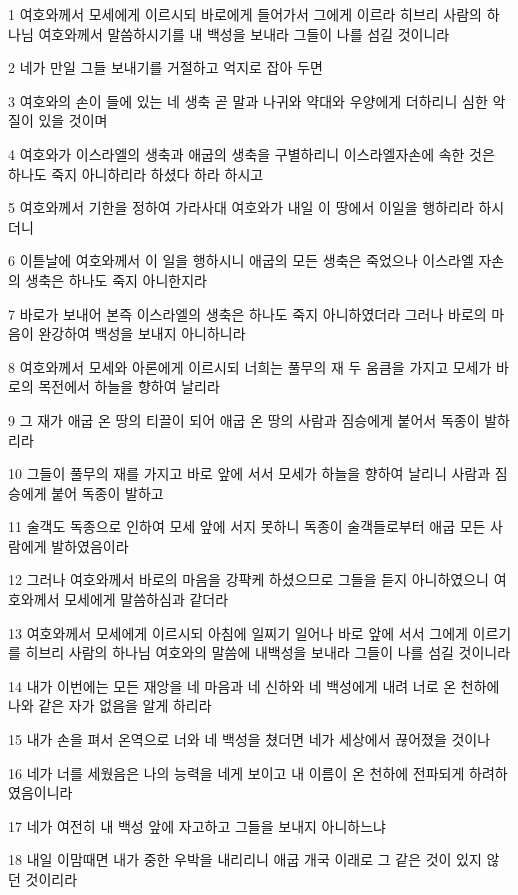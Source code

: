 \par 1 여호와께서 모세에게 이르시되 바로에게 들어가서 그에게 이르라 히브리 사람의 하나님 여호와께서 말씀하시기를 내 백성을 보내라 그들이 나를 섬길 것이니라
\par 2 네가 만일 그들 보내기를 거절하고 억지로 잡아 두면
\par 3 여호와의 손이 들에 있는 네 생축 곧 말과 나귀와 약대와 우양에게 더하리니 심한 악질이 있을 것이며
\par 4 여호와가 이스라엘의 생축과 애굽의 생축을 구별하리니 이스라엘자손에 속한 것은 하나도 죽지 아니하리라 하셨다 하라 하시고
\par 5 여호와께서 기한을 정하여 가라사대 여호와가 내일 이 땅에서 이일을 행하리라 하시더니
\par 6 이튿날에 여호와께서 이 일을 행하시니 애굽의 모든 생축은 죽었으나 이스라엘 자손의 생축은 하나도 죽지 아니한지라
\par 7 바로가 보내어 본즉 이스라엘의 생축은 하나도 죽지 아니하였더라 그러나 바로의 마음이 완강하여 백성을 보내지 아니하니라
\par 8 여호와께서 모세와 아론에게 이르시되 너희는 풀무의 재 두 움큼을 가지고 모세가 바로의 목전에서 하늘을 향하여 날리라
\par 9 그 재가 애굽 온 땅의 티끌이 되어 애굽 온 땅의 사람과 짐승에게 붙어서 독종이 발하리라
\par 10 그들이 풀무의 재를 가지고 바로 앞에 서서 모세가 하늘을 향하여 날리니 사람과 짐승에게 붙어 독종이 발하고
\par 11 술객도 독종으로 인하여 모세 앞에 서지 못하니 독종이 술객들로부터 애굽 모든 사람에게 발하였음이라
\par 12 그러나 여호와께서 바로의 마음을 강퍅케 하셨으므로 그들을 듣지 아니하였으니 여호와께서 모세에게 말씀하심과 같더라
\par 13 여호와께서 모세에게 이르시되 아침에 일찌기 일어나 바로 앞에 서서 그에게 이르기를 히브리 사람의 하나님 여호와의 말씀에 내백성을 보내라 그들이 나를 섬길 것이니라
\par 14 내가 이번에는 모든 재앙을 네 마음과 네 신하와 네 백성에게 내려 너로 온 천하에 나와 같은 자가 없음을 알게 하리라
\par 15 내가 손을 펴서 온역으로 너와 네 백성을 쳤더면 네가 세상에서 끊어졌을 것이나
\par 16 네가 너를 세웠음은 나의 능력을 네게 보이고 내 이름이 온 천하에 전파되게 하려하였음이니라
\par 17 네가 여전히 내 백성 앞에 자고하고 그들을 보내지 아니하느냐
\par 18 내일 이맘때면 내가 중한 우박을 내리리니 애굽 개국 이래로 그 같은 것이 있지 않던 것이리라
